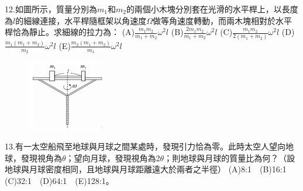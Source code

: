 \documentclass[cn,10pt,math=newtx,chinesefont=founder,device=ig]{elegantbook}
\begin{document}
\begin{example}
   12.如圖所示，質量分別為$m_1$和$m_2$的兩個小木塊分別套在光滑的水平桿上，以長度為$l$的細線連接，水平桿隨框架以角速度$\Omega$做等角速度轉動，而兩木塊相對於水平桿恰為靜止。求細線的拉力為：
   (A)$\frac{m_1 m_2}{m_1 +m_2} \omega^2 l$ (B)$\frac{2 m_1 m_2}{m_1 +m_2} \omega^2 l$
   (C)$\frac{m_1 m_2}{2(m_1 +m_2)} \omega^2 l$ (D) $\frac{m_1(m_1 +m_2)}{m_2} \omega^2 l$
   (E)$\frac{m_2(m_1 +m_2)}{m_1} \omega^2 l$
   \\
    \rightline{[成德高中教甄109]}
\end{example}
\begin{solution}
    
\end{solution}
\begin{figure}[htbp]
    \flushright
    \includegraphics[width=0.3\textwidth]{image/109成德12.png}
  \end{figure}
\newpage

\begin{example}
   13.有一太空船飛至地球與月球之間某處時，發現引力恰為零。此時太空人望向地球，發現視角為$\theta$；望向月球，發現視角為2$\theta$；則地球與月球的質量比為何？（設地球與月球密度相同，且地球與月球距離遠大於兩者之半徑）
   (A)8:1　(B)16:1　(C)32:1　(D)64:1　(E)128:1。
   \\
    \rightline{[成德高中教甄109]}
\end{example}
\begin{solution}
    
\end{solution}

\newpage
\end{document}
